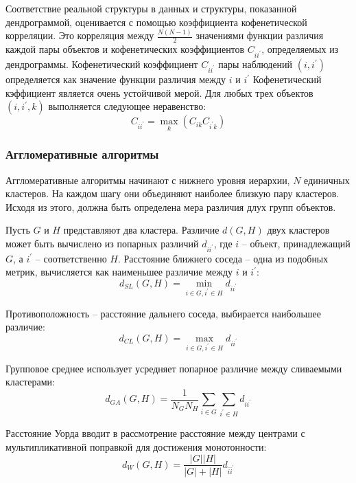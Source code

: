 Соответствие реальной структуры в данных  и структуры, показанной дендрограммой, оценивается с помощью коэффициента кофенетической корреляции. Это корреляция между $\frac{N(N-1)}{2}$ значениями функции различия каждой пары объектов и кофенетических коэффициентов $C_{ii^\prime}$, определяемых из дендрограммы. Кофенетический коэффициент $C_{ii^\prime}$ пары наблюдений $(i,i^\prime)$ определяется как значение функции различия между $i$ и $i^\prime$
Кофенетический кэффициент является очень устойчивой мерой. Для любых трех объектов $(i, i^\prime,k)$ выполняется следующее неравенство:
\begin{equation}
	C_{ii^\prime} = \max_k(C_{ik} C_{i^\prime k})
\end{equation}

\subsubsection{Аггломеративные алгоритмы}

Аггломеративные алгоритмы начинают с нижнего уровня иерархии, $N$ единичных кластеров. На каждом шагу они объединяют наиболее близкую пару кластеров. Исходя из этого, должна быть определена мера различия длух групп объектов.

Пусть $G$ и $H$ представляют два кластера. Различие $d(G, H)$ двух кластеров может быть вычислено из попарных различий $d_{ii^\prime}$, где $i$ -- объект, принадлежащий $G$, а $i^\prime$ -- соответственно $H$. Расстояние ближнего соседа -- одна из подобных метрик, вычисляется как наименьшее различие между $i$ и $i^\prime$:
\begin{equation}
	d_{SL}(G,H) = \min_{i \in G, i^\prime \in H} d_{ii^\prime}
\end{equation}

Противоположность -- расстояние дальнего соседа, выбирается наибольшее различие:
\begin{equation}
	d_{CL}(G,H) = \max_{i \in G, i^\prime \in H} d_{ii^\prime}
\end{equation}

Групповое среднее использует усредняет попарное различие между сливаемыми кластерами:
\begin{equation}
	d_{GA}(G, H) = \frac{1}{N_GN_H} \sum_{i \in G}\sum_{i^\prime \in H} d_{ii^\prime}
\end{equation}

Расстояние Уорда вводит в рассмотрение расстояние между центрами с мультипликативной поправкой для достижения монотонности:
\begin{equation}
	d_{W}(G,H) = \frac{|G||H|}{|G|+|H|}d_{\bar{i}\bar{i}^\prime}
\end{equation}

